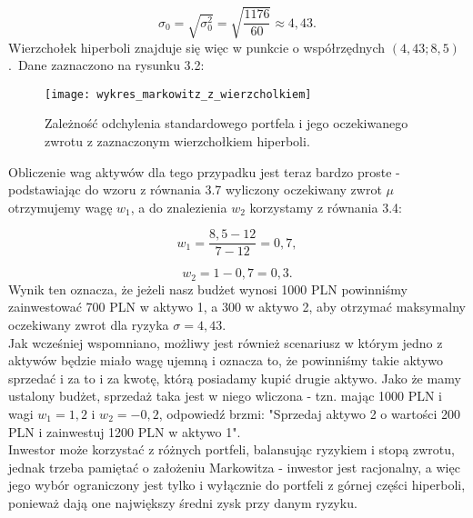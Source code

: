 \documentclass[magister]{dyplom}
\begin{document}
\begin{equation}
	\sigma_0 = \sqrt{\sigma_0^2} = \sqrt{\frac{1176}{60}} \approx 4,43.
\end{equation}
Wierzchołek hiperboli znajduje się więc w punkcie o współrzędnych $(4,43; 8,5)$. Dane zaznaczono na rysunku 3.2:\\
\begin{figure}[h]
	\centering
	\texttt{[image: wykres\_markowitz\_z\_wierzcholkiem]}
	\caption{Zależność odchylenia standardowego portfela i jego oczekiwanego zwrotu z zaznaczonym wierzchołkiem hiperboli.}
\end{figure}

Obliczenie wag aktywów dla tego przypadku jest teraz bardzo proste - podstawiając do wzoru z równania 3.7 wyliczony oczekiwany zwrot $\mu$ otrzymujemy wagę $w_1$, a do znalezienia $w_2$ korzystamy z równania 3.4:

\begin{equation}
	w_1 = \frac{8,5 - 12}{7 - 12} = 0,7,
\end{equation}

\begin{equation}
	w_2 = 1 - 0,7 = 0,3.
\end{equation}
Wynik ten oznacza, że jeżeli nasz budżet wynosi 1000 PLN powinniśmy zainwestować 700 PLN w aktywo 1, a 300 w aktywo 2, aby otrzymać maksymalny oczekiwany zwrot dla ryzyka $\sigma = 4,43$.\\

Jak wcześniej wspomniano, możliwy jest również scenariusz w którym jedno z aktywów będzie miało wagę ujemną i oznacza to, że powinniśmy takie aktywo sprzedać i za to i za kwotę, którą posiadamy kupić drugie aktywo. Jako że mamy ustalony budżet, sprzedaż taka jest w niego wliczona - tzn. mając 1000 PLN i wagi $w_1 = 1,2$ i $w_2 = -0,2$, odpowiedź brzmi: "Sprzedaj aktywo 2 o wartości 200 PLN i zainwestuj 1200 PLN w aktywo 1".\\

Inwestor może korzystać z różnych portfeli, balansując ryzykiem i stopą zwrotu, jednak trzeba pamiętać o założeniu Markowitza - inwestor jest racjonalny, a więc jego wybór ograniczony jest tylko i wyłącznie do portfeli z górnej części hiperboli, ponieważ dają one największy średni zysk przy danym ryzyku.
\end{document}
